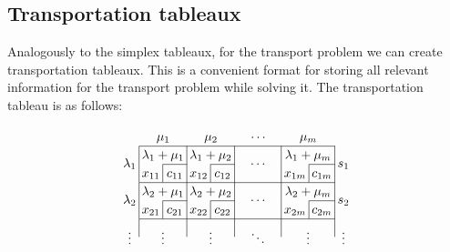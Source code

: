 \subsection{Transportation tableaux}
Analogously to the simplex tableaux, for the transport problem we can create transportation tableaux.
This is a convenient format for storing all relevant information for the transport problem while solving it.
The transportation tableau is as follows:

\[
	\arraycolsep=2pt\def\arraystretch{1.2}
	\begin{array}{c|c|c|c|c|c|c|c|c|c}
		\multicolumn{1}{c}{}           & \multicolumn{2}{c}{\mu_1}                        & \multicolumn{2}{c}{\mu_2}                        & \multicolumn{2}{c}{\cdots}                       & \multicolumn{2}{c}{\mu_m}                        & \multicolumn{1}{c}{}                                                         \\\cline{2-9}
		\multirow{2}{*}{\(\lambda_1\)} & \multicolumn{2}{c|}{\lambda_1 + \mu_1}           & \multicolumn{2}{c|}{\lambda_1 + \mu_2}           & \multicolumn{2}{c|}{\multirow{2}{*}{\(\cdots\)}} & \multicolumn{2}{c|}{\lambda_1 + \mu_m}           & \multirow{2}{*}{\(s_1\)}                                                     \\\cline{3-3}\cline{5-5}\cline{9-9}
		                               & \multicolumn{1}{c|}{x_{11}}                      & c_{11}                                           & \multicolumn{1}{c|}{x_{12}}                      & c_{12}                                           & \multicolumn{2}{c|}{\ \;\qquad\;\ } & \multicolumn{1}{c|}{x_{1m}} & c_{1m} & \\\cline{2-9}
		\multirow{2}{*}{\(\lambda_2\)} & \multicolumn{2}{c|}{\lambda_2 + \mu_1}           & \multicolumn{2}{c|}{\lambda_2 + \mu_2}           & \multicolumn{2}{c|}{\multirow{2}{*}{\(\cdots\)}} & \multicolumn{2}{c|}{\lambda_2 + \mu_m}           & \multirow{2}{*}{\(s_2\)}                                                     \\\cline{3-3}\cline{5-5}\cline{9-9}
		                               & \multicolumn{1}{c|}{x_{21}}                      & c_{21}                                           & \multicolumn{1}{c|}{x_{22}}                      & c_{22}                                           & \multicolumn{2}{c|}{}               & \multicolumn{1}{c|}{x_{2m}} & c_{2m} & \\\cline{2-9}
		\multirow{2}{*}{\(\vdots\)}    & \multicolumn{2}{c|}{\multirow{2}{*}{\(\vdots\)}} & \multicolumn{2}{c|}{\multirow{2}{*}{\(\vdots\)}} & \multicolumn{2}{c|}{\multirow{2}{*}{\(\ddots\)}} & \multicolumn{2}{c|}{\multirow{2}{*}{\(\vdots\)}} & \multirow{2}{*}{\(\vdots\)}                                                  \\

\end{array}\]
